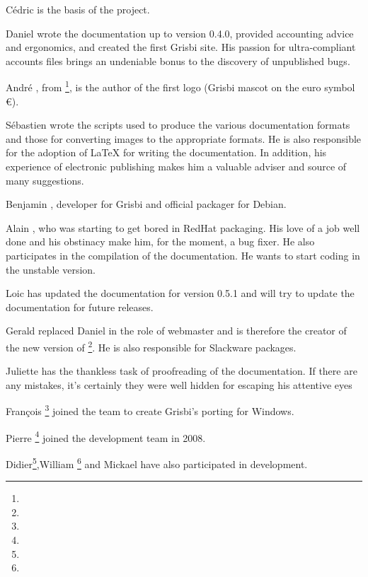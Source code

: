 Cédric  is the basis of the project.

Daniel  wrote the documentation up to version 0.4.0, provided accounting advice and ergonomics, and created the first Grisbi site. His passion for ultra-compliant accounts files brings an undeniable bonus to the discovery of unpublished bugs.

André , from \footnote{\urlLinuxGraphic{}}, is the author of the first logo (Grisbi mascot on the euro symbol €).

Sébastien  wrote the scripts used to produce the various documentation formats and those for converting images to the appropriate formats. He is also responsible for the adoption of \gls{LaTeX} for writing the documentation. In addition, his experience of electronic publishing makes him a valuable adviser and source of many suggestions.

Benjamin , developer for Grisbi and official packager for \gls{Debian}.

Alain , who was starting to get bored in \gls{RedHat} packaging. His love of a job well done and his obstinacy make him, for the moment, a bug fixer. He also participates in the compilation of the documentation. He wants to start coding in the unstable version.

Loic  has updated the documentation for version 0.5.1 and will try to update the documentation for future releases.

Gerald  replaced Daniel  in the role of webmaster and is therefore the creator of the new version of \footnote{\urlGrisbi{}}. He is also responsible for \gls{Slackware} packages.

Juliette  has the thankless task of proofreading of the documentation. If there are any mistakes, it's certainly they were well hidden for escaping his attentive eyes

François \footnote{\urlFrancoisTerrotEmail{}} joined the team to create Grisbi's \gls{porting} for Windows.

{Pierre }\footnote{\urlPierreBiavaEmail{}} joined the development team in 2008.

Didier\footnote{\urlDidierChevalierEmail{}},William \footnote{\urlWilliamOllivierEmail{}} and Mickael  have also participated in development.

